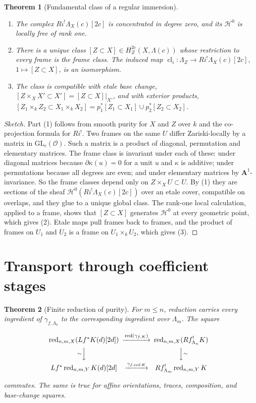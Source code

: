 \documentclass[10pt]{article}
\newtheorem{theorem}{Theorem}[section]
\theoremstyle{definition}
\newcommand{\red}{\operatorname{red}}
\begin{document}
\begin{theorem}[Fundamental class of a regular immersion]
\begin{enumerate}
\item The complex \(Ri^!\Lambda_X(c)[2c]\) is concentrated in degree zero,
  and its \(\mathcal H^0\) is locally free of rank one.
\item There is a unique class \([Z\subset X]\in H^{2c}_Z(X,\Lambda(c))\)
  whose restriction to every frame is the frame class.  The induced map
  \(\operatorname{cl}_i:\Lambda_Z\to Ri^!\Lambda_X(c)[2c]\),
  \(1\mapsto[Z\subset X]\), is an isomorphism.
\item The class is compatible with etale base change,
  \([Z\times_XX'\subset X']=[Z\subset X]|_{X'}\), and with exterior products,
  \([Z_1\times_kZ_2\subset X_1\times_kX_2]=p_1^*[Z_1\subset X_1]\cup
  p_2^*[Z_2\subset X_2]\).
\end{enumerate}
\end{theorem}

\begin{proof}[Sketch]
Part (1) follows from smooth purity for \(X\) and \(Z\) over \(k\) and the
co-projection formula for \(Ri^!\).  Two frames on the same \(U\) differ
Zariski-locally by a matrix in \(\mathrm{GL}_c(\mathcal O)\).  Such a matrix
is a product of diagonal, permutation and elementary matrices.  The frame
class is invariant under each of these: under diagonal matrices because
\(\partial\kappa(u)=0\) for a unit \(u\) and \(\kappa\) is additive; under
permutations because all degrees are even; and under elementary matrices
by \(\mathbf A^1\)-invariance.  So the frame classes depend only on
\(Z\times_XU\subset U\).  By (1) they are sections of the sheaf
\(\mathcal H^0(Ri^!\Lambda_X(c)[2c])\) over an etale cover, compatible on
overlaps, and they glue to a unique global class.  The rank-one local
calculation, applied to a frame, shows that \([Z\subset X]\) generates
\(\mathcal H^0\) at every geometric point, which gives (2).  Etale maps
pull frames back to frames, and the product of frames on \(U_1\) and
\(U_2\) is a frame on \(U_1\times_kU_2\), which gives (3).
\end{proof}

\section{Transport through coefficient stages}

\begin{theorem}[Finite reduction of purity]
For \(m\leq n\), reduction carries every ingredient of
\(\gamma_{f,\Lambda_n}\) to the corresponding ingredient over
\(\Lambda_m\).  The square

\[
\begin{CD}
\red_{n,m,X}(Lf^*K(d)[2d]) @>{\red(\gamma_{f,K})}>>
\red_{n,m,X}(Rf^!_{\Lambda_n}K)\\
@V{\sim}VV @VV{\sim}V\\
Lf^*\red_{n,m,Y}K(d)[2d] @>{\gamma_{f,\red K}}>>
Rf^!_{\Lambda_m}\red_{n,m,Y}K
\end{CD}
\]

commutes.  The same is true for affine orientations, traces, composition,
and base-change squares.
\end{theorem}
\end{document}

